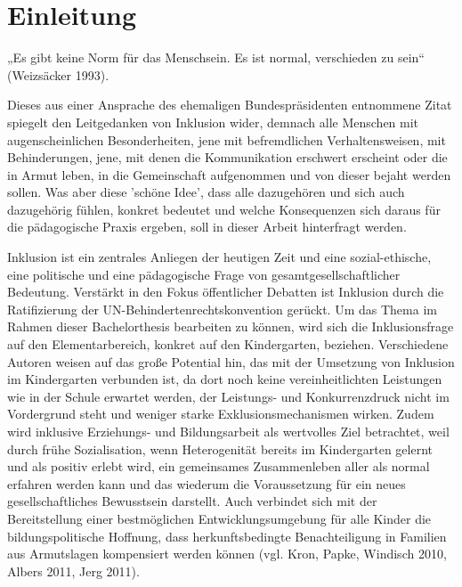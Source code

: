 \chapter{Einleitung}

„Es gibt keine Norm für das Menschsein. Es ist normal, verschieden zu sein“ (Weizsäcker 1993).
 

Dieses aus einer Ansprache des ehemaligen Bundespräsidenten entnommene Zitat spiegelt den Leitgedanken von Inklusion wider, demnach alle Menschen mit augenscheinlichen Besonderheiten, jene mit befremdlichen Verhaltensweisen, mit Behinderungen, jene, mit denen die Kommunikation erschwert erscheint oder die in Armut leben, in die Gemeinschaft aufgenommen und von dieser bejaht werden sollen. 
Was aber diese 'schöne Idee', dass alle dazugehören und sich auch dazugehörig fühlen, konkret bedeutet und welche Konsequenzen sich daraus für die pädagogische Praxis ergeben, soll in dieser Arbeit hinterfragt werden.

Inklusion ist ein zentrales Anliegen der heutigen Zeit und eine sozial-ethische, eine politische und eine pädagogische Frage von gesamtgesellschaftlicher Bedeutung. Verstärkt in den Fokus öffentlicher Debatten ist Inklusion durch die Ratifizierung der UN-Behindertenrechtskonvention gerückt.
Um das Thema im Rahmen dieser Bachelorthesis bearbeiten zu können, wird 
sich die Inklusionsfrage auf den Elementarbereich, konkret auf den Kindergarten, beziehen. Verschiedene Autoren weisen auf das große Potential hin, das mit der Umsetzung von Inklusion im Kindergarten verbunden ist, da dort noch keine vereinheitlichten Leistungen wie in der Schule erwartet werden, der Leistungs- und Konkurrenzdruck nicht im Vordergrund steht und weniger starke Exklusionsmechanismen wirken. Zudem wird inklusive Erziehungs- und Bildungsarbeit als wertvolles Ziel betrachtet, weil durch frühe Sozialisation, wenn Heterogenität bereits im Kindergarten gelernt und als positiv erlebt wird, ein gemeinsames Zusammenleben aller als normal erfahren werden kann und das wiederum die Voraussetzung für ein neues gesellschaftliches Bewusstsein darstellt. Auch verbindet sich mit der Bereitstellung einer bestmöglichen Entwicklungsumgebung für alle Kinder die bildungspolitische Hoffnung, dass herkunftsbedingte Benachteiligung in Familien aus Armutslagen kompensiert werden können (vgl. Kron, Papke, Windisch 2010, Albers 2011, Jerg 2011). 

